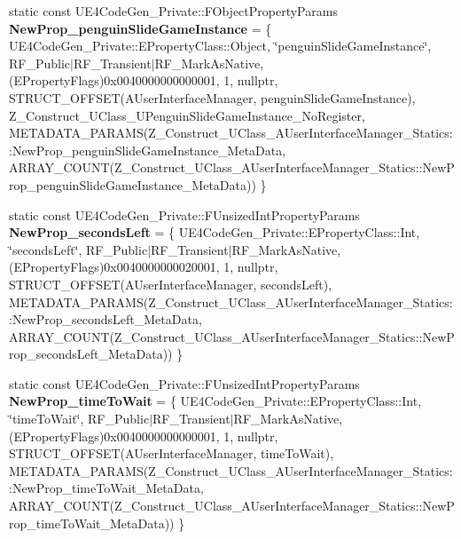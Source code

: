 \begin{DoxyCompactItemize}
static const U\+E4\+Code\+Gen\+\_\+\+Private\+::\+F\+Object\+Property\+Params {\bfseries New\+Prop\+\_\+penguin\+Slide\+Game\+Instance} = \{ U\+E4\+Code\+Gen\+\_\+\+Private\+::\+E\+Property\+Class\+::\+Object, \char`\"{}penguin\+Slide\+Game\+Instance\char`\"{}, R\+F\+\_\+\+Public$\vert$R\+F\+\_\+\+Transient$\vert$R\+F\+\_\+\+Mark\+As\+Native, (E\+Property\+Flags)0x0040000000000001, 1, nullptr, S\+T\+R\+U\+C\+T\+\_\+\+O\+F\+F\+S\+E\+T(\+A\+User\+Interface\+Manager, penguin\+Slide\+Game\+Instance), Z\+\_\+\+Construct\+\_\+\+U\+Class\+\_\+\+U\+Penguin\+Slide\+Game\+Instance\+\_\+\+No\+Register, M\+E\+T\+A\+D\+A\+T\+A\+\_\+\+P\+A\+R\+A\+M\+S(\+Z\+\_\+\+Construct\+\_\+\+U\+Class\+\_\+\+A\+User\+Interface\+Manager\+\_\+\+Statics\+::\+New\+Prop\+\_\+penguin\+Slide\+Game\+Instance\+\_\+\+Meta\+Data, A\+R\+R\+A\+Y\+\_\+\+C\+O\+U\+N\+T(\+Z\+\_\+\+Construct\+\_\+\+U\+Class\+\_\+\+A\+User\+Interface\+Manager\+\_\+\+Statics\+::\+New\+Prop\+\_\+penguin\+Slide\+Game\+Instance\+\_\+\+Meta\+Data)) \}
\item 
\mbox{\label{struct_z___construct___u_class___a_user_interface_manager___statics_ae3dd5d01f2b2f0c5ef73ae2eba2f5475}} 
static const U\+E4\+Code\+Gen\+\_\+\+Private\+::\+F\+Unsized\+Int\+Property\+Params {\bfseries New\+Prop\+\_\+seconds\+Left} = \{ U\+E4\+Code\+Gen\+\_\+\+Private\+::\+E\+Property\+Class\+::\+Int, \char`\"{}seconds\+Left\char`\"{}, R\+F\+\_\+\+Public$\vert$R\+F\+\_\+\+Transient$\vert$R\+F\+\_\+\+Mark\+As\+Native, (E\+Property\+Flags)0x0040000000020001, 1, nullptr, S\+T\+R\+U\+C\+T\+\_\+\+O\+F\+F\+S\+E\+T(\+A\+User\+Interface\+Manager, seconds\+Left), M\+E\+T\+A\+D\+A\+T\+A\+\_\+\+P\+A\+R\+A\+M\+S(\+Z\+\_\+\+Construct\+\_\+\+U\+Class\+\_\+\+A\+User\+Interface\+Manager\+\_\+\+Statics\+::\+New\+Prop\+\_\+seconds\+Left\+\_\+\+Meta\+Data, A\+R\+R\+A\+Y\+\_\+\+C\+O\+U\+N\+T(\+Z\+\_\+\+Construct\+\_\+\+U\+Class\+\_\+\+A\+User\+Interface\+Manager\+\_\+\+Statics\+::\+New\+Prop\+\_\+seconds\+Left\+\_\+\+Meta\+Data)) \}
\item 
\mbox{\label{struct_z___construct___u_class___a_user_interface_manager___statics_a4fb8a93f4560c774d63d0a908c4be0e6}} 
static const U\+E4\+Code\+Gen\+\_\+\+Private\+::\+F\+Unsized\+Int\+Property\+Params {\bfseries New\+Prop\+\_\+time\+To\+Wait} = \{ U\+E4\+Code\+Gen\+\_\+\+Private\+::\+E\+Property\+Class\+::\+Int, \char`\"{}time\+To\+Wait\char`\"{}, R\+F\+\_\+\+Public$\vert$R\+F\+\_\+\+Transient$\vert$R\+F\+\_\+\+Mark\+As\+Native, (E\+Property\+Flags)0x0040000000000001, 1, nullptr, S\+T\+R\+U\+C\+T\+\_\+\+O\+F\+F\+S\+E\+T(\+A\+User\+Interface\+Manager, time\+To\+Wait), M\+E\+T\+A\+D\+A\+T\+A\+\_\+\+P\+A\+R\+A\+M\+S(\+Z\+\_\+\+Construct\+\_\+\+U\+Class\+\_\+\+A\+User\+Interface\+Manager\+\_\+\+Statics\+::\+New\+Prop\+\_\+time\+To\+Wait\+\_\+\+Meta\+Data, A\+R\+R\+A\+Y\+\_\+\+C\+O\+U\+N\+T(\+Z\+\_\+\+Construct\+\_\+\+U\+Class\+\_\+\+A\+User\+Interface\+Manager\+\_\+\+Statics\+::\+New\+Prop\+\_\+time\+To\+Wait\+\_\+\+Meta\+Data)) \}

\end{DoxyCompactItemize}
